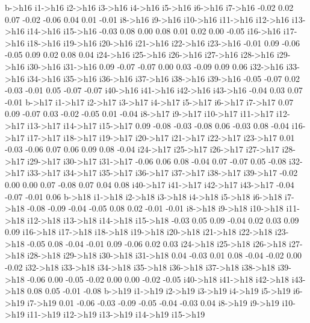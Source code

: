 \documentclass{article}
\begin{document}
\begin{Schunk}
\begin{Soutput}
  b->h16  i1->h16  i2->h16  i3->h16  i4->h16  i5->h16  i6->h16  i7->h16 
   -0.02     0.02     0.07    -0.02    -0.06     0.04     0.01    -0.01 
 i8->h16  i9->h16 i10->h16 i11->h16 i12->h16 i13->h16 i14->h16 i15->h16 
   -0.03     0.08     0.00     0.08     0.01     0.02     0.00    -0.05 
i16->h16 i17->h16 i18->h16 i19->h16 i20->h16 i21->h16 i22->h16 i23->h16 
   -0.01     0.09    -0.06    -0.05     0.09     0.02     0.08     0.04 
i24->h16 i25->h16 i26->h16 i27->h16 i28->h16 i29->h16 i30->h16 i31->h16 
    0.09    -0.07    -0.07     0.00     0.03    -0.09     0.09     0.06 
i32->h16 i33->h16 i34->h16 i35->h16 i36->h16 i37->h16 i38->h16 i39->h16 
   -0.05    -0.07     0.02    -0.03    -0.01     0.05    -0.07    -0.07 
i40->h16 i41->h16 i42->h16 i43->h16 
   -0.04     0.03     0.07    -0.01 
  b->h17  i1->h17  i2->h17  i3->h17  i4->h17  i5->h17  i6->h17  i7->h17 
    0.07     0.09    -0.07     0.03    -0.02    -0.05     0.01    -0.04 
 i8->h17  i9->h17 i10->h17 i11->h17 i12->h17 i13->h17 i14->h17 i15->h17 
    0.09    -0.08    -0.03    -0.08     0.06    -0.03     0.08    -0.04 
i16->h17 i17->h17 i18->h17 i19->h17 i20->h17 i21->h17 i22->h17 i23->h17 
    0.01    -0.03    -0.06     0.07     0.06     0.09     0.08    -0.04 
i24->h17 i25->h17 i26->h17 i27->h17 i28->h17 i29->h17 i30->h17 i31->h17 
   -0.06     0.06     0.08    -0.04     0.07    -0.07     0.05    -0.08 
i32->h17 i33->h17 i34->h17 i35->h17 i36->h17 i37->h17 i38->h17 i39->h17 
   -0.02     0.00     0.00     0.07    -0.08     0.07     0.04     0.08 
i40->h17 i41->h17 i42->h17 i43->h17 
   -0.04    -0.07    -0.01     0.06 
  b->h18  i1->h18  i2->h18  i3->h18  i4->h18  i5->h18  i6->h18  i7->h18 
   -0.08    -0.09    -0.04    -0.05     0.08     0.02    -0.01    -0.01 
 i8->h18  i9->h18 i10->h18 i11->h18 i12->h18 i13->h18 i14->h18 i15->h18 
   -0.03     0.05     0.09    -0.04     0.02     0.03     0.09     0.09 
i16->h18 i17->h18 i18->h18 i19->h18 i20->h18 i21->h18 i22->h18 i23->h18 
   -0.05     0.08    -0.04    -0.01     0.09    -0.06     0.02     0.03 
i24->h18 i25->h18 i26->h18 i27->h18 i28->h18 i29->h18 i30->h18 i31->h18 
    0.04    -0.03     0.01     0.08    -0.04    -0.02     0.00    -0.02 
i32->h18 i33->h18 i34->h18 i35->h18 i36->h18 i37->h18 i38->h18 i39->h18 
   -0.06     0.00    -0.05    -0.02     0.00     0.00    -0.02    -0.05 
i40->h18 i41->h18 i42->h18 i43->h18 
    0.08     0.05    -0.01    -0.08 
  b->h19  i1->h19  i2->h19  i3->h19  i4->h19  i5->h19  i6->h19  i7->h19 
    0.01    -0.06    -0.03    -0.09    -0.05    -0.04    -0.03     0.04 
 i8->h19  i9->h19 i10->h19 i11->h19 i12->h19 i13->h19 i14->h19 i15->h19 

\end{Soutput}
\end{Schunk}
\end{document}
